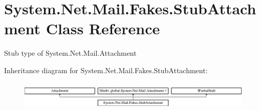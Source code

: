 \hypertarget{class_system_1_1_net_1_1_mail_1_1_fakes_1_1_stub_attachment}{\section{System.\-Net.\-Mail.\-Fakes.\-Stub\-Attachment Class Reference}
\label{class_system_1_1_net_1_1_mail_1_1_fakes_1_1_stub_attachment}
}


Stub type of System.\-Net.\-Mail.\-Attachment 


Inheritance diagram for System.\-Net.\-Mail.\-Fakes.\-Stub\-Attachment\-:\begin{figure}[H]
\begin{center}
\leavevmode
\includegraphics[height=1.398252cm]{class_system_1_1_net_1_1_mail_1_1_fakes_1_1_stub_attachment}
\end{center}
\end{figure}
